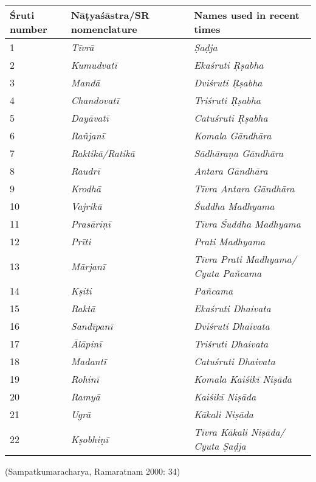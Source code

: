 \begin{tabular}{|l|l|l|}
\hline
Śruti number & Nāṭyaśāstra/SR nomenclature & Names used in recent times \\
\hline
1 & \textit{Tīvrā} & \textit{Ṣaḍja} \\
\hline
2 & \textit{Kumudvatī} & \textit{Ekaśruti Ṛṣabha} \\
\hline
3 & \textit{Mandā} & \textit{Dviśruti Ṛṣabha} \\
\hline
4 & \textit{Chandovatī} & \textit{Triśruti Ṛṣabha} \\
\hline
5 & \textit{Dayāvatī} & \textit{Catuśruti Ṛṣabha} \\
\hline
6 & \textit{Rañjanī} & \textit{Komala Gāndhāra} \\
\hline
7 & \textit{Raktikā/Ratikā} & \textit{Sādhāraṇa Gāndhāra} \\
\hline
8 & \textit{Raudrī} & \textit{Antara Gāndhāra} \\
\hline
9 & \textit{Krodhā} & \textit{Tīvra Antara Gāndhāra} \\
\hline
10 & \textit{Vajrikā} & \textit{Śuddha Madhyama} \\
\hline
11 & \textit{Prasāriṇī} & \textit{Tīvra Śuddha Madhyama} \\
\hline
12 & \textit{Prīti} & \textit{Prati Madhyama} \\
\hline
13 & \textit{Mārjanī} & \textit{Tīvra Prati Madhyama/ Cyuta Pañcama} \\
\hline
14 & \textit{Kṣiti} & \textit{Pañcama} \\
\hline
15 & \textit{Raktā} & \textit{Ekaśruti Dhaivata} \\
\hline
16 & \textit{Sandīpanī} & \textit{Dviśruti Dhaivata} \\
\hline
17 & \textit{Ālāpinī} & \textit{Triśruti Dhaivata} \\
\hline
18 & \textit{Madantī} & \textit{Catuśruti Dhaivata} \\
\hline
19 & \textit{Rohinī} & \textit{Komala Kaiśikī Niṣāda} \\
\hline
20 & \textit{Ramyā} & \textit{Kaiśikī Niṣāda} \\
\hline
21 & \textit{Ugrā} & \textit{Kākali Niṣāda} \\
\hline
22 & \textit{Kṣobhiṇī} & \textit{Tīvra Kākali Niṣāda/ Cyuta Ṣaḍja} \\
\hline
\end{tabular}

\begin{flushright}
(Sampatkumaracharya, Ramaratnam 2000: 34)
\end{flushright}

